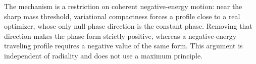 \begin{remark}
The mechanism is a restriction on coherent negative-energy motion:
near the sharp mass threshold, variational compactness forces a
profile close to a real optimizer, whose only null phase direction is
the constant phase. Removing that direction makes the phase form
strictly positive, whereas a negative-energy traveling profile requires
a negative value of the same form. This argument is independent of
radiality and does not use a maximum principle.
\end{remark}
